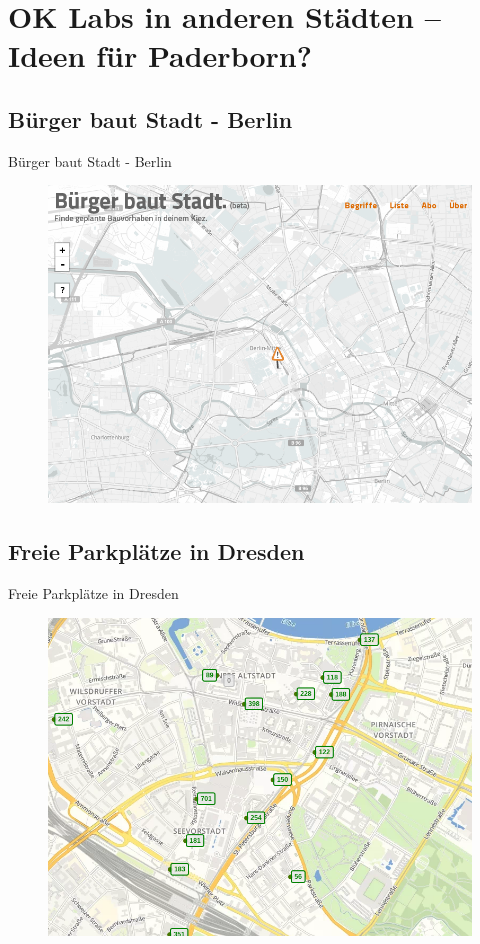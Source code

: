 \section{OK Labs in anderen Städten -- Ideen für Paderborn?}

\subsection{Bürger baut Stadt - Berlin}
\begin{frame}[t]{Bürger baut Stadt - Berlin}
\begin{figure}[h]
 \centering
 \includegraphics[scale=0.3]{section_other_ok_labs_constructions.png}
\end{figure}
\end{frame}

\subsection{Freie Parkplätze in Dresden}
\begin{frame}[t]{Freie Parkplätze in Dresden}
\begin{figure}[h]
 \centering
 \includegraphics[scale=0.3]{section_other_ok_labs_parking.png}
\end{figure}
\end{frame}

